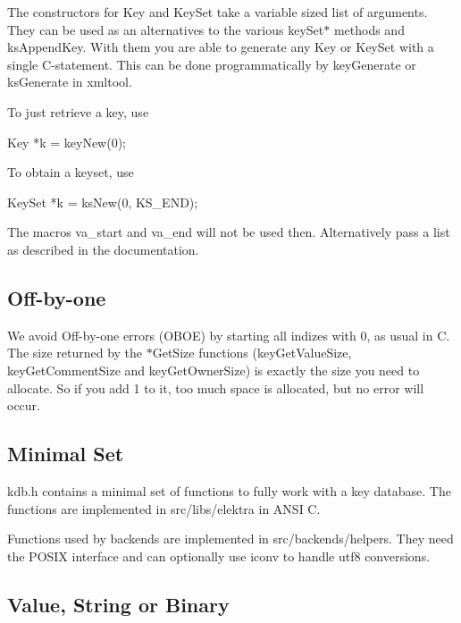 The constructors for {\ttfamily Key} and {\ttfamily Key\+Set} take a variable sized list of arguments. They can be used as an alternatives to the various {\ttfamily key\+Set$\ast$} methods and {\ttfamily ks\+Append\+Key}. With them you are able to generate any {\ttfamily Key} or {\ttfamily Key\+Set} with a single C-\/statement. This can be done programmatically by {\ttfamily key\+Generate} or {\ttfamily ks\+Generate} in {\ttfamily xmltool}.

To just retrieve a key, use \begin{DoxyVerb}    Key *k = keyNew(0);
\end{DoxyVerb}


To obtain a {\ttfamily keyset}, use \begin{DoxyVerb}    KeySet *k = ksNew(0, KS_END);
\end{DoxyVerb}


The macros {\ttfamily va\+\_\+start} and {\ttfamily va\+\_\+end} will not be used then. Alternatively pass a list as described in the documentation.

\subsection*{Off-\/by-\/one}

We avoid Off-\/by-\/one errors (O\+B\+O\+E) by starting all indizes with 0, as usual in C. The size returned by the {\ttfamily $\ast$\+Get\+Size} functions ({\ttfamily key\+Get\+Value\+Size}, {\ttfamily key\+Get\+Comment\+Size} and {\ttfamily key\+Get\+Owner\+Size}) is exactly the size you need to allocate. So if you add 1 to it, too much space is allocated, but no error will occur.

\subsection*{Minimal Set}

{\ttfamily kdb.\+h} contains a minimal set of functions to fully work with a key database. The functions are implemented in {\ttfamily src/libs/elektra} in A\+N\+S\+I C.

Functions used by backends are implemented in {\ttfamily src/backends/helpers}. They need the P\+O\+S\+I\+X interface and can optionally use {\ttfamily iconv} to handle utf8 conversions.

\subsection*{Value, String or Binary}

